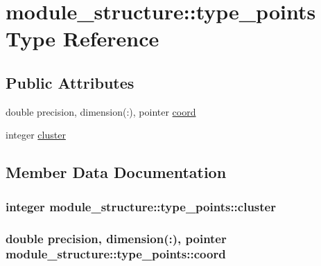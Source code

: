 \hypertarget{structmodule__structure_1_1type__points}{}\section{module\+\_\+structure\+:\+:type\+\_\+points Type Reference}
\label{structmodule__structure_1_1type__points}
\subsection*{Public Attributes}
\begin{DoxyCompactItemize}
\item 
double precision, dimension(\+:), pointer \hyperlink{structmodule__structure_1_1type__points_a81d059927ede51f531d5ac3e97bb654c}{coord}
\item 
integer \hyperlink{structmodule__structure_1_1type__points_a04dcced1bb30414993dc5e2d9546ef61}{cluster}
\end{DoxyCompactItemize}


\subsection{Member Data Documentation}
\hypertarget{structmodule__structure_1_1type__points_a04dcced1bb30414993dc5e2d9546ef61}{}
\subsubsection[{cluster}]{\setlength{\rightskip}{0pt plus 5cm}integer module\+\_\+structure\+::type\+\_\+points\+::cluster}\label{structmodule__structure_1_1type__points_a04dcced1bb30414993dc5e2d9546ef61}
\hypertarget{structmodule__structure_1_1type__points_a81d059927ede51f531d5ac3e97bb654c}{}
\subsubsection[{coord}]{\setlength{\rightskip}{0pt plus 5cm}double precision, dimension(\+:), pointer module\+\_\+structure\+::type\+\_\+points\+::coord}\label{structmodule__structure_1_1type__points_a81d059927ede51f531d5ac3e97bb654c}
